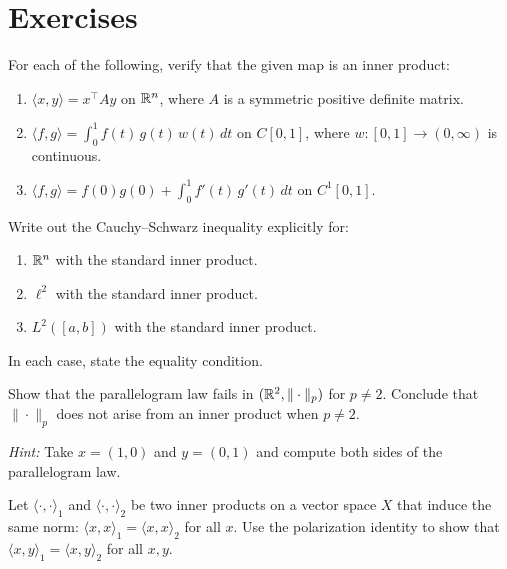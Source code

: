 \documentclass[11pt,a4paper]{article}
\begin{document}

\section{Exercises}
\label{sec:exercises}

\begin{exercise}
\label{ex:verify_ip}
For each of the following, verify that the given map is an inner product:
\begin{enumerate}[label=(\alph*),nosep]
    \item $\langle x, y \rangle = x^\top A y$ on $\mathbb{R}^n$, where $A$ is a
          symmetric positive definite matrix.
    \item $\langle f, g \rangle = \int_0^1 f(t)\, g(t)\, w(t)\, dt$ on
          $C[0,1]$, where $w \colon [0,1] \to (0,\infty)$ is continuous.
    \item $\langle f, g \rangle = f(0) g(0) + \int_0^1 f'(t)\, g'(t)\, dt$
          on $C^1[0,1]$.
\end{enumerate}
\end{exercise}

\begin{exercise}
\label{ex:cs_specific}
Write out the Cauchy--Schwarz inequality explicitly for:
\begin{enumerate}[label=(\alph*),nosep]
    \item $\mathbb{R}^n$ with the standard inner product.
    \item $\ell^2$ with the standard inner product.
    \item $L^2([a,b])$ with the standard inner product.
\end{enumerate}
In each case, state the equality condition.
\end{exercise}

\begin{exercise}
\label{ex:parallelogram_fails}
Show that the parallelogram law fails in $(\mathbb{R}^2, \|\cdot\|_p)$ for
$p \ne 2$. Conclude that $\|\cdot\|_p$ does not arise from an inner product
when $p \ne 2$.

\noindent\textit{Hint:} Take $x = (1, 0)$ and $y = (0, 1)$ and compute
both sides of the parallelogram law.
\end{exercise}

\begin{exercise}
\label{ex:polarization_unique}
Let $\langle \cdot, \cdot \rangle_1$ and $\langle \cdot, \cdot \rangle_2$
be two inner products on a vector space $X$ that induce the same norm:
$\langle x, x \rangle_1 = \langle x, x \rangle_2$ for all $x$. Use the
polarization identity to show that
$\langle x, y \rangle_1 = \langle x, y \rangle_2$ for all $x, y$.
\end{exercise}
\end{document}
